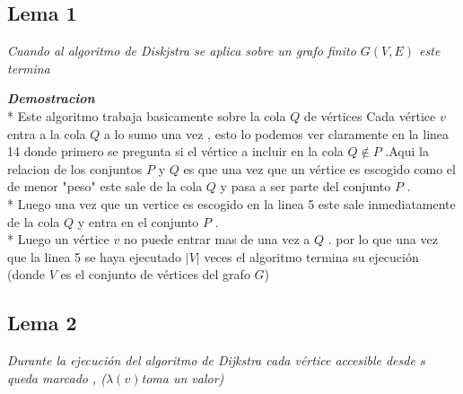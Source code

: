 \documentclass[10pt]{article}
\begin{document}
    
    \subsection*{Lema 1}
        \noindent  \textit{Cuando al algoritmo de Diskjstra se aplica sobre un grafo finito $G\left(V,E\right)$ este termina} 

        \vspace{0.5cm} 
        \noindent \textit{\textbf{Demostracion } }
        \\*
        \noindent Este algoritmo trabaja basicamente sobre la cola $Q$ de v\'ertices 
        Cada v\'ertice $v$ entra a la cola $Q$ a lo sumo una vez , esto lo podemos ver claramente en la linea 14 donde primero se pregunta si el v\'ertice a incluir en 
        la cola $Q \notin P $ .Aqui la relacion de los conjuntos $P$ y $Q$ es que una vez que un v\'ertice es escogido como el de menor "peso" este sale de la cola 
        $Q$ y pasa a ser parte del conjunto $P$ . 
        \\*
        Luego una vez que un vertice es escogido en la linea 5 este sale inmediatamente de la cola $Q$ y entra en el conjunto $P$ . 
        \\*
        Luego un v\'ertice $v$ no puede entrar mas de una vez a $Q$ . por lo que una vez que la linea 5 se haya ejecutado $|V|$ veces el algoritmo termina su ejecuci\'on (donde $V$  es el conjunto de v\'ertices del grafo $G$)
    
    \subsection*{Lema 2} 
        \noindent \textit{Durante la ejecuci\'on del algoritmo de Dijkstra cada v\'ertice accesible desde $s$ queda marcado , ($\lambda (v)$toma un valor) }
        
\end{document}
